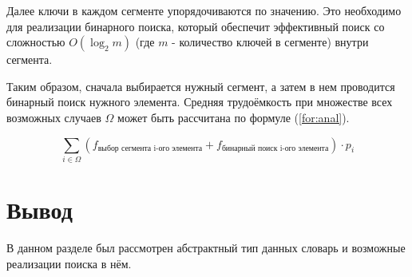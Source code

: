 Далее ключи в каждом сегменте упорядочиваются по значению. Это необходимо для реализации бинарного поиска, который обеспечит эффективный поиск со сложностью $O(\log_2 m)$ (где $m$ - количество ключей в сегменте) внутри сегмента.

Таким образом, сначала выбирается нужный сегмент, а затем в нем проводится бинарный поиск нужного элемента. Средняя трудоёмкость при множестве всех возможных случаев $\Omega$ может быть рассчитана по формуле (\ref{for:anal}). 

\begin{equation}
    \label{for:anal}
    \sum_{i \in \Omega}{\left(f_{\text{выбор сегмента i-ого элемента}} + f_{\text{бинарный поиск i-ого элемента}}\right)} \cdot p_i
\end{equation}


\section*{Вывод}
В данном разделе был рассмотрен абстрактный тип данных словарь и возможные реализации поиска в нём.
